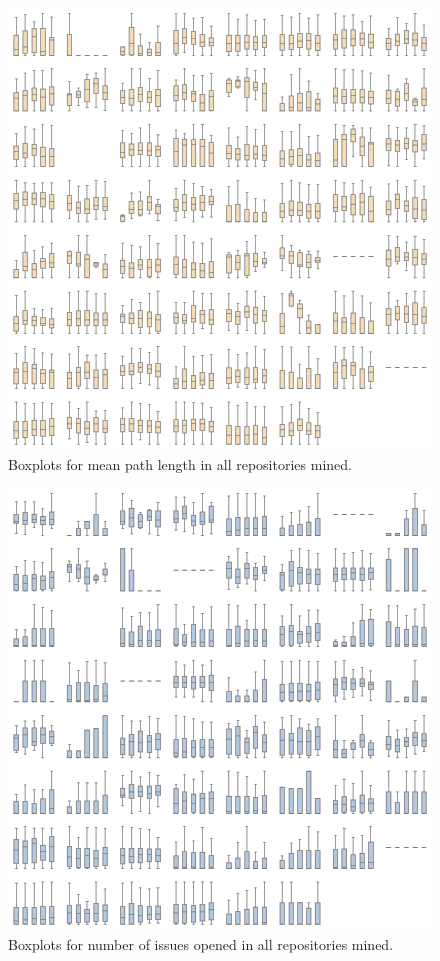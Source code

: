 \begin{appendices}
    \begin{figure}
        \centering
        \includegraphics[width=\textwidth]{figures/quantitative/boxplots/grids/mean_path.png}
        \caption{Boxplots for mean path length in all repositories mined.}
        \label{app:mean_path-box-app}
    \end{figure}

    \begin{figure}
        \centering
        \includegraphics[width=\textwidth]{figures/quantitative/boxplots/grids/issues_opened.png}
        \caption{Boxplots for number of issues opened in all repositories mined.}
        \label{app:issues_opened-box-app}
    \end{figure}


\end{appendices}
